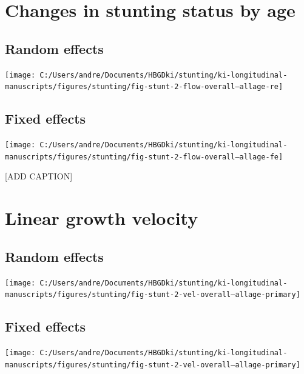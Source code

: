 \documentclass[
  9pt,
]{book}
\begin{document}
\hypertarget{changes-in-stunting-status-by-age}{%
\section{Changes in stunting status by age}\label{changes-in-stunting-status-by-age}}

\hypertarget{random-effects-2}{%
\subsection{Random effects}\label{random-effects-2}}

\texttt{[image: C:/Users/andre/Documents/HBGDki/stunting/ki-longitudinal-manuscripts/figures/stunting/fig-stunt-2-flow-overall--allage-re]}

\hypertarget{fixed-effects-3}{%
\subsection{Fixed effects}\label{fixed-effects-3}}

\texttt{[image: C:/Users/andre/Documents/HBGDki/stunting/ki-longitudinal-manuscripts/figures/stunting/fig-stunt-2-flow-overall--allage-fe]}

{[}ADD CAPTION{]}

\hypertarget{linear-growth-velocity-1}{%
\section{Linear growth velocity}\label{linear-growth-velocity-1}}

\hypertarget{random-effects-3}{%
\subsection{Random effects}\label{random-effects-3}}

\texttt{[image: C:/Users/andre/Documents/HBGDki/stunting/ki-longitudinal-manuscripts/figures/stunting/fig-stunt-2-vel-overall--allage-primary]}

\hypertarget{fixed-effects-4}{%
\subsection{Fixed effects}\label{fixed-effects-4}}

\texttt{[image: C:/Users/andre/Documents/HBGDki/stunting/ki-longitudinal-manuscripts/figures/stunting/fig-stunt-2-vel-overall--allage-primary]}

  
\end{document}
